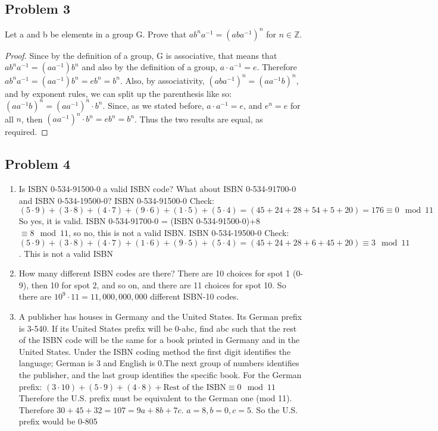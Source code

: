 \documentclass[12pt]{article}
\newcommand{\Z}{\mathbb{Z}}
\begin{document}
\subsection{Problem 3}
Let a and b be elements in a group G. Prove that $ab^na^{-1}=(aba^{-1})^n$ for $n\in\Z$.
\begin{proof}
Since by the definition of a group, G is associative, that means that $ab^na^{-1}=(aa^{-1})b^n$ and also by the definition of a group, $a\cdot a^{-1}=e$. Therefore $ab^na^{-1}=(aa^{-1})b^n=eb^n=b^n$. Also, by associativity, $(aba^{-1})^n=(aa^{-1}b)^n$, and by exponent rules, we can split up the parenthesis like so: $(aa^{-1}b)^n=(aa^{-1})^n\cdot b^n$. Since, as we stated before, $a\cdot a^{-1}=e$, and $e^n=e$ for all $n$, then $(aa^{-1})^n\cdot b^n=eb^n=b^n$. Thus the two results are equal, as required.
\end{proof}
\subsection{Problem 4}
\begin{enumerate}[label=(\alph*)]
    \item Is ISBN 0-534-91500-0 a valid ISBN code? What about ISBN 0-534-91700-0 and ISBN 0-534-19500-0?
    \newline ISBN  0-534-91500-0 Check: $(5\cdot9)+(3\cdot8)+(4\cdot7)+(9\cdot6)+(1\cdot5)+(5\cdot4)=(45+24+28+54+5+20)=176\equiv0\mod11$ So yes, it is valid.
    \newline ISBN 0-534-91700-0 = (ISBN  0-534-91500-0)+8$\equiv8\mod11$, so no, this is not a valid ISBN.
    \newline ISBN 0-534-19500-0 Check: $(5\cdot9)+(3\cdot8)+(4\cdot7)+(1\cdot6)+(9\cdot5)+(5\cdot4)=(45+24+28+6+45+20)\equiv3\mod11$. This is not a valid ISBN
    \item How many different ISBN codes are there?
    \newline There are 10 choices for spot 1 (0-9), then 10 for spot 2, and so on, and there are 11 choices for spot 10. So there are $10^9\cdot11=11,000,000,000$ different ISBN-10 codes.
    \item A publisher has houses in Germany and the United States. Its German prefix is 3-540. If its United States prefix will be 0-abc, find abc such that the rest of the ISBN code will be the same for a book printed in Germany and in the United States. Under the ISBN coding method the first digit identifies the language; German is 3 and English is 0.The next group of numbers identifies the publisher, and the last group identifies the specific book.
    \newline For the German prefix: $(3\cdot10)+(5\cdot9)+(4\cdot8)+\text{Rest of the ISBN}\equiv0\mod11$
    \newline Therefore the U.S. prefix must be equivalent to the German one (mod 11). Therefore $30+45+32=107=9a+8b+7c$. $a=8,b=0,c=5$. So the U.S. prefix would be 0-805
\end{enumerate}
\end{document}
